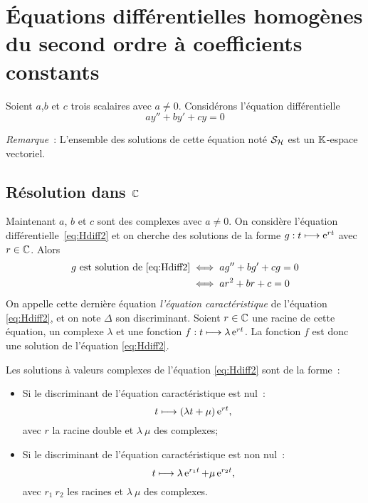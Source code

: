 \section{Équations différentielles homogènes du second ordre à coefficients constants}
\label{sec:eqdiffsecondordrecoefconstants}
Soient \(a\),\(b\) et \(c\) trois scalaires avec \(a \neq 0\). Considérons l'équation différentielle
\begin{equation}
  \label{eq:Hdiff2}
  ay''+by'+cy=0
\end{equation}

\emph{Remarque}~: L'ensemble des solutions de cette équation noté \(\mathcal{S}_{\mathcal{H}}\) est un \(\mathbb{K}\)-espace vectoriel.
%
\subsection{Résolution dans \(\mathbb{C}\)}
\label{subsec:resdansC}
Maintenant \(a\), \(b\) et \(c\) sont des complexes avec \(a \neq 0\). On considère l'équation différentielle~\eqref{eq:Hdiff2} et on cherche des solutions de la forme \(g :t \longmapsto \operatorname{e}^{rt}\) avec \(r \in \mathbb{C}\). Alors 
\begin{align}
  g\text{~est solution de } \eqref{eq:Hdiff2} & \iff ag'' + bg'+cg=0  \\ & \iff ar^2+br+c=0
\end{align}
On appelle cette dernière équation \emph{l'équation caractéristique} de l'équation \eqref{eq:Hdiff2}, et on note \(\Delta\) son discriminant. Soient \(r \in \mathbb{C}\) une racine de cette équation, un complexe \(\lambda\) et une fonction \(f:t \longmapsto \lambda \operatorname{e}^{rt}\). La fonction \(f\) est donc une solution de l'équation \eqref{eq:Hdiff2}.
%
\begin{theo}
  \label{theo:5} 
  Les solutions à valeurs complexes de l'équation \eqref{eq:Hdiff2} sont de la forme~:
  \begin{itemize}
  \item Si le discriminant de l'équation caractéristique est nul~: 
    \begin{equation} 
      t \longmapsto (\lambda t + \mu)\operatorname{e}^{rt},
    \end{equation} 
    avec \(r\) la racine double et \(\lambda \ \mu\) des complexes;
  \item Si le discriminant de l'équation caractéristique est non nul~: 
    \begin{equation} 
      t \longmapsto \lambda \operatorname{e}^{r_1 t} + \mu \operatorname{e}^{r_2 t},
    \end{equation} 
    avec \(r_1 \ r_2\) les racines et \(\lambda \ \mu\) des complexes.
  \end{itemize}
\end{theo}
